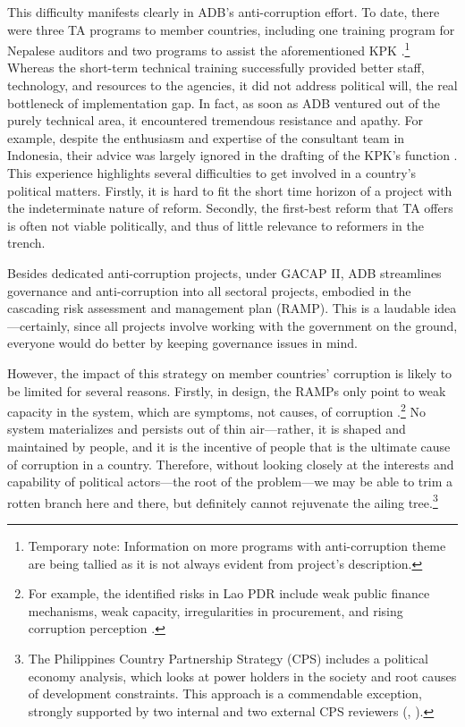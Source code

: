 \documentclass[12pt]{article}
\begin{document}
This difficulty manifests clearly in ADB's anti-corruption effort. To date, there were three TA programs to member countries, including one training program for Nepalese auditors and two programs to assist the aforementioned KPK \citep{ADB2003, ADB2005, ADB2011}.\footnote{Temporary note: Information on more programs with anti-corruption theme are being tallied as it is not always evident from project's description.}  Whereas the short-term technical training successfully provided better staff, technology, and resources to the agencies, it did not address political will, the real bottleneck of implementation gap. In fact, as soon as ADB ventured out of the purely technical area, it encountered tremendous resistance and apathy. For example, despite the enthusiasm and expertise of the consultant team in Indonesia, their advice was largely ignored in the drafting of the KPK's function \citep{ADB2003, Schutte2012}. This experience highlights several difficulties to get involved in a country's political matters. Firstly, it is hard to fit the short time horizon of a project with the indeterminate nature of reform. Secondly, the first-best reform that TA offers is often not viable politically, and thus of little relevance to reformers in the trench.

Besides dedicated anti-corruption projects, under GACAP II, ADB streamlines governance and anti-corruption into all sectoral projects, embodied in the cascading risk assessment and management plan (RAMP). This is a laudable idea---certainly, since all projects involve working with the government on the ground, everyone would do better by keeping governance issues in mind.

However, the impact of this strategy on member countries' corruption is likely to be limited for several reasons. Firstly, in design, the RAMPs only point to weak capacity in the system, which are symptoms, not causes, of corruption \citep[6]{ADB2013}.\footnote{For example, the identified risks in Lao PDR include weak public finance mechanisms, weak capacity, irregularities in procurement, and rising corruption perception \citep{ADB2011a}.} No system materializes and persists out of thin air---rather, it is shaped and maintained by people, and it is the incentive of people that is the ultimate cause of corruption in a country. Therefore, without looking closely at the interests and capability of political actors---the root of the problem---we may be able to trim a rotten branch here and there, but definitely cannot rejuvenate the ailing tree.\footnote{The Philippines Country Partnership Strategy (CPS) includes a political economy analysis, which looks at power holders in the society and root causes of development constraints. This approach is a commendable exception, strongly supported by two internal and two external CPS reviewers (\citealp{ADB2010}, \citealp{ADB2011b}).}
\end{document}
